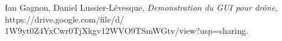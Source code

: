 \documentclass[journal]{IEEEtran}
\begin{document}
%


%
%
%
\begin{thebibliography}{1}

Ian Gagnon, Daniel Lussier-Lévesque, \emph{Demonstration du GUI pour drône},\newline
https://drive.google.com/file/d/\newline
1W9yt0Z4YxCwr0TjXkgv12WVO9TSmWGtv/view?usp=sharing.

\end{thebibliography}







\end{document}
